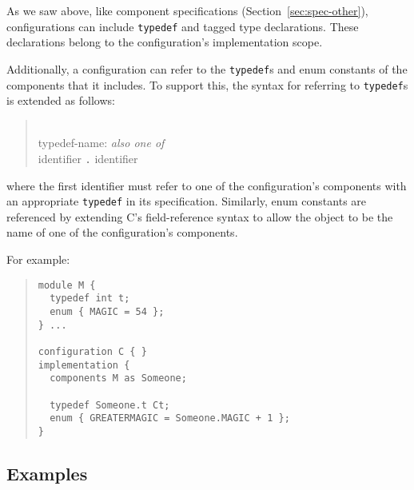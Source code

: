\documentclass[11pt,letterpaper]{article}
\newcommand{\kw}[1]{{\tt #1}}
\newcommand{\grammarshift}{\vspace*{-.7cm}}
\newcommand{\grammarindent}{\hspace*{2cm}\= \\ \kill}
\begin{document}
As we saw above, like component specifications
(Section~\ref{sec:spec-other}), configurations can include \kw{typedef} and
tagged type declarations. These declarations belong to the configuration's
implementation scope.

Additionally, a configuration can refer to the \kw{typedef}s and enum
constants of the components that it includes. To support this, the
syntax for referring to  \kw{typedef}s is extended as follows:
\begin{quote} \grammarshift \em \begin{tabbing}
\grammarindent
typedef-name: \emph{also one of}\\
\>	identifier \kw{.} identifier
\end{tabbing} \end{quote}
where the first identifier must refer to one of the configuration's
components with an appropriate \kw{typedef} in its
specification. Similarly, enum constants are referenced by extending C's
field-reference syntax to allow the object to be the name of one of the
configuration's components.

For example:
\begin{quote} \begin{verbatim}
module M {
  typedef int t;
  enum { MAGIC = 54 };
} ...

configuration C { }
implementation {
  components M as Someone;

  typedef Someone.t Ct;
  enum { GREATERMAGIC = Someone.MAGIC + 1 };
}
\end{verbatim} \end{quote}

\subsection{Examples}
\end{document}
